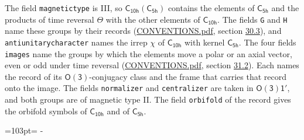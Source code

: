 \documentclass[10pt,a4paper]{article}
\newcommand{\needspace}[1]{\par\penalty-100\begingroup\dimen0=#1\relax\dimen2=\pagegoal
  \advance\dimen2-\pagetotal\ifdim\dimen0>\dimen2\relax\ifdim\dimen2>0pt\vfil\break\fi\fi
  \endgroup}
\numberwithin{equation}{section}
\newcommand{\grp}[1]{\mathsf{#1}}
\begin{document}
The field \texttt{magnetictype} is III, so $\grp{C_{10h}}(\grp{C_{5h}})$ contains the elements of $\grp{C_{5h}}$ and the products of time reversal $\varTheta$ with the other elements of $\grp{C_{10h}}$. The fields \texttt{G} and \texttt{H} name these groups by their records (\href{../../CONVENTIONS.pdf}{CONVENTIONS.pdf}, section \href{../../CONVENTIONS.pdf\#conv.30.3}{30.3}), and \texttt{antiunitarycharacter} names the irrep $\chi$ of $\grp{C_{10h}}$ with kernel $\grp{C_{5h}}$. The four fields \texttt{images} name the groups by which the elements move a polar or an axial vector, even or odd under time reversal (\href{../../CONVENTIONS.pdf}{CONVENTIONS.pdf}, section \href{../../CONVENTIONS.pdf\#conv.31.2}{31.2}). Each names the record of its $\grp{O(3)}$-conjugacy class and the frame that carries that record onto the image. The fields \texttt{normalizer} and \texttt{centralizer} are taken in $\grp{O(3)1'}$, and both groups are of magnetic type II. The field \texttt{orbifold} of the record gives the orbifold symbols of $\grp{C_{10h}}$ and of $\grp{C_{5h}}$.
\needspace{103pt}
\end{document}
